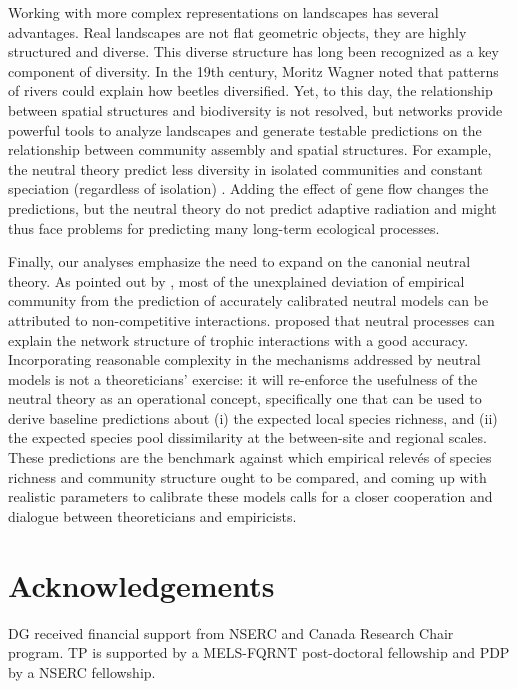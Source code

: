 \documentclass[12pt]{article}
\begin{document}
Working with more complex representations on landscapes has several advantages.
Real landscapes are not flat geometric objects, they are highly structured and
diverse. This diverse structure has long been recognized as a key component of
diversity. In the 19th century, Moritz Wagner noted that patterns of rivers
\cite{coy04} could explain how beetles diversified. Yet, to this day, the
relationship between spatial structures and biodiversity is not resolved, but
networks provide powerful tools to analyze landscapes and generate testable
predictions on the relationship between community assembly and spatial
structures. For example, the neutral theory predict less diversity in isolated
communities and constant speciation (regardless of isolation) \parencite{Economo2008}.
Adding the effect of gene flow changes the predictions, but the neutral theory
do not predict adaptive radiation and might thus face problems for predicting
many long-term ecological processes.

Finally, our analyses emphasize the need to expand on the canonial neutral
theory. As pointed out by \textcite{Wootton2005}, most of the unexplained
deviation of empirical community from the prediction of accurately calibrated
neutral models can be attributed to non-competitive interactions. \textcite{Canard2012}
proposed that neutral processes can explain the network structure of trophic
interactions with a good accuracy. Incorporating reasonable complexity in the
mechanisms addressed by neutral models is not a theoreticians' exercise: it will
re-enforce the usefulness of the neutral theory as an operational concept,
specifically one that can be used to derive baseline predictions about (i) the
expected local species richness, and (ii) the expected species pool
dissimilarity at the between-site and regional scales. These predictions are the
benchmark against which empirical relev\'es of species richness and community
structure ought to be compared, and coming up with realistic parameters to
calibrate these models calls for a closer cooperation and dialogue between
theoreticians and empiricists.


\section*{Acknowledgements}
DG received financial support from NSERC and Canada Research Chair program. TP
is supported by a MELS-FQRNT post-doctoral fellowship and PDP by a NSERC
fellowship.
\newpage
\end{document}
